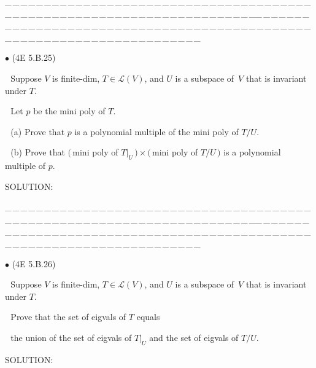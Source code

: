 \documentclass[a4paper, 11pt, UTF8]{article}
\def\Lm{\mathcal{L}}
\begin{document}
\begin{large}
\par
{\tiny \_\,\_\,\_\,\_\,\_\,\_\,\_\,\_\,\_\,\_\,\_\,\_\,\_\,\_\,\_\,\_\,\_\,\_\,\_\,\_\,\_\,\_\,\_\,\_\,\_\,\_\,\_\,\_\,\_\,\_\,\_\,\_\,\_\,\_\,\_\,\_\,\_\,\_\,\_\,\_\,\_\,\_\,\_\,\_\,\_\,\_\,\_\,\_\,\_\,\_\,\_\,\_\,\_\,\_\,\_\,\_\,\_\,\_\,\_\,\_\,\_\,\_\,\_\,\_\,\_\,\_\,\_\,\_\,\_\,\_\,\_\_\,\_\,\_\,\_\,\_\,\_\,\_\,\_\,\_\,\_\,\_\,\_\,\_\,\_\,\_\,\_\,\_\,\_\,\_\,\_\,\_\,\_\,\_\,\_\,\_\,\_\,\_\,\_\,\_\,\_\,\_\,\_\,\_\,\_\,\_\,\_\,\_\,\_\,\_\,\_\,\_\,\_\,\_\,\_\,\_\,\_\,\_\,\_\,\_\,\_\,\_\,\_\,\_\,\_\,\_\,\_\,\_\,\_\,\_\,\_\,\_\,\_\,\_\,\_\,\_\,\_\,\_\,\_\,\_\,\_\,\_}\par

{\small $\bullet$} (\normalsize{4E 5.B.25})\par\,\, {\timessl\Large 
Suppose $V$ is finite-dim, $T\in \Lm(V)$, and $U$ is a subspace of \,$V$ that is invariant under $T$.}\par\,\,
{\timessl\Large
Let $p$ be the mini poly of $T.$
}\par\,\,
(a) {\timessl\Large Prove that $p$ is a polynomial multiple of the mini poly of $T/U$.}\par\,\,
(b) {\timessl\Large
Prove that
$(\,$mini poly of $T|_U\,) \times (\,$mini poly of $T/U\,)$ is a polynomial multiple of $p$.
}\par
{\timesbf S\footnotesize{OLUTION:}}\par\quad

\par
{\tiny \_\,\_\,\_\,\_\,\_\,\_\,\_\,\_\,\_\,\_\,\_\,\_\,\_\,\_\,\_\,\_\,\_\,\_\,\_\,\_\,\_\,\_\,\_\,\_\,\_\,\_\,\_\,\_\,\_\,\_\,\_\,\_\,\_\,\_\,\_\,\_\,\_\,\_\,\_\,\_\,\_\,\_\,\_\,\_\,\_\,\_\,\_\,\_\,\_\,\_\,\_\,\_\,\_\,\_\,\_\,\_\,\_\,\_\,\_\,\_\,\_\,\_\,\_\,\_\,\_\,\_\,\_\,\_\,\_\,\_\,\_\_\,\_\,\_\,\_\,\_\,\_\,\_\,\_\,\_\,\_\,\_\,\_\,\_\,\_\,\_\,\_\,\_\,\_\,\_\,\_\,\_\,\_\,\_\,\_\,\_\,\_\,\_\,\_\,\_\,\_\,\_\,\_\,\_\,\_\,\_\,\_\,\_\,\_\,\_\,\_\,\_\,\_\,\_\,\_\,\_\,\_\,\_\,\_\,\_\,\_\,\_\,\_\,\_\,\_\,\_\,\_\,\_\,\_\,\_\,\_\,\_\,\_\,\_\,\_\,\_\,\_\,\_\,\_\,\_\,\_\,\_}\par

{\small $\bullet$} (\normalsize{4E 5.B.26})\par\,\, {\timessl\Large 
Suppose $V$ is finite-dim, $T\in \Lm(V)$, and $U$ is a subspace of \,$V$ that is invariant under $T$.}\par\,\,
{\timessl\Large Prove that the set of eigvals of $T$ equals}\par\,\,
{\timessl\Large the union of the set of eigvals of $T|_U$ and the set of eigvals of $T/U$.
}\par
{\timesbf S\footnotesize{OLUTION:}}\par\quad


\end{large}
\end{document}
